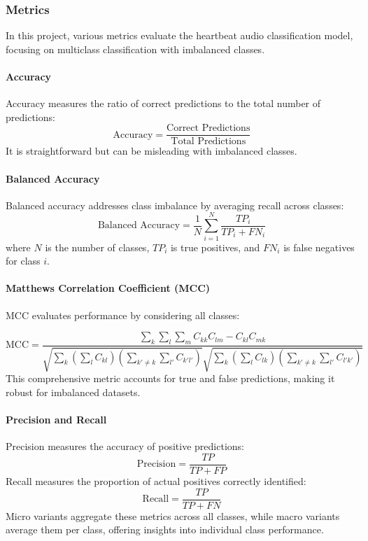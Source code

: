 \subsubsection*{Metrics}

In this project, various metrics evaluate the heartbeat audio classification model, focusing on multiclass classification with imbalanced classes.

\paragraph{Accuracy}
Accuracy measures the ratio of correct predictions to the total number of predictions:
\[
    \text{Accuracy} = \frac{\text{Correct Predictions}}{\text{Total Predictions}}
\]
It is straightforward but can be misleading with imbalanced classes.

\paragraph{Balanced Accuracy}
Balanced accuracy addresses class imbalance by averaging recall across classes:
\[
    \text{Balanced Accuracy} = \frac{1}{N} \sum_{i=1}^{N} \frac{TP_i}{TP_i + FN_i}
\]
where \(N\) is the number of classes, \(TP_i\) is true positives, and \(FN_i\) is false negatives for class \(i\).

\paragraph{Matthews Correlation Coefficient (MCC)}
MCC evaluates performance by considering all classes:

\[
    \text{MCC} = \frac{\sum_k \sum_l \sum_m C_{kk} C_{lm} - C_{kl} C_{mk}}{\sqrt{\sum_k \left( \sum_l C_{kl} \right) \left( \sum_{k' \ne k} \sum_{l'} C_{k'l'} \right)} \sqrt{\sum_k \left( \sum_l C_{lk} \right) \left( \sum_{k' \ne k} \sum_{l'} C_{l'k'} \right)}}
\]
This comprehensive metric accounts for true and false predictions, making it robust for imbalanced datasets.

\paragraph{Precision and Recall}
Precision measures the accuracy of positive predictions:
\[
    \text{Precision} = \frac{TP}{TP + FP}
\]
Recall measures the proportion of actual positives correctly identified:
\[
    \text{Recall} = \frac{TP}{TP + FN}
\]
Micro variants aggregate these metrics across all classes, while macro variants average them per class, 
offering insights into individual class performance.

